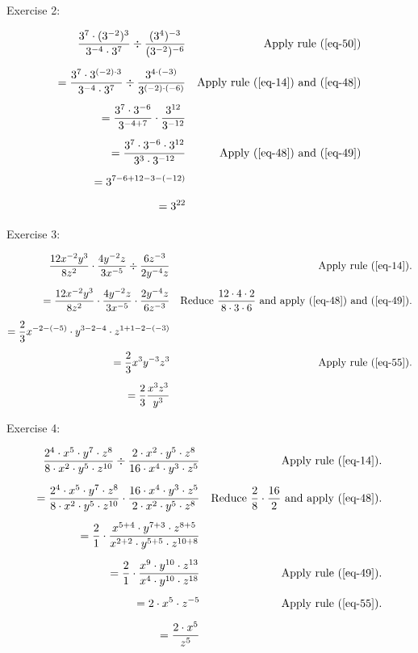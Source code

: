 Exercise 2:

\begin{align*}
    \frac{3^7 \cdot (3^{-2})^3}{3^{-4} \cdot 3^7} \div \frac{(3^4)^{-3}}{(3^{-2})^{-6}} &&\text{Apply rule \bref{eq-50}} &\\[1.25ex]
    = \frac{3^7 \cdot 3^{(-2) \cdot 3}}{3^{-4} \cdot 3^7} \div \frac{3^{4 \cdot {(-3)}}}{3^{(-2) \cdot (-6)}} &&\text{Apply rule \bref{eq-14} and \bref{eq-48}} &\\[1.25ex]
    = \frac{3^7 \cdot 3^{-6}}{3^{-4+7}} \cdot \frac{3^{12}}{3^{-12}} &\\[1.25ex]
    = \frac{3^7 \cdot 3^{-6} \cdot 3^{12}}{3^3 \cdot 3^{-12}}&&\text{Apply \bref{eq-48} and \bref{eq-49}}&\\[1.25ex]
    = 3^{7-6+12-3-(-12)}&\\[1.25ex]
    = 3^{22}&
\end{align*}

Exercise 3:

\begin{align*}
    \frac{12x^{-2} y^3}{8z^2} \cdot \frac{4y^{-2}z}{3x^{-5}} \div \frac{6z^{-3}}{2y^{-4}z} &&\text{Apply rule \bref{eq-14}.}&\\[1.25ex]
    =\frac{12x^{-2} y^3}{8z^2} \cdot \frac{4y^{-2}z}{3x^{-5}} \cdot \frac{2y^{-4}z}{6z^{-3}}&&\text{Reduce $\frac{12\cdot4\cdot2}{8\cdot3\cdot6}$ and apply \bref{eq-48} and \bref{eq-49}.}&\\[1.25ex]
    =\frac{2}{3}x^{-2-(-5)}\cdot y^{3-2-4}\cdot z^{1+1-2-(-3)}&\\[1.25ex]
    =\frac{2}{3}x^3 y^{-3} z^3 &&\text{Apply rule \bref{eq-55}.}&\\[1.25ex]
    =\frac{2}{3}\frac{x^3 z^3}{y^3}&
\end{align*}

Exercise 4:

\begin{align*}
    \frac{2^4 \cdot x^5 \cdot y^7 \cdot z^8}{8 \cdot x^2 \cdot y^5 \cdot z^{10}} \div \frac{2 \cdot x^2 \cdot y^5 \cdot z^8}{16 \cdot x^4 \cdot y^3 \cdot z^5}&&\text{Apply rule \bref{eq-14}.}&\\[1.25ex]
    = \frac{2^4 \cdot x^5 \cdot y^7 \cdot z^8}{8 \cdot x^2 \cdot y^5 \cdot z^{10}} \cdot \frac{16 \cdot x^4 \cdot y^3 \cdot z^5}{2 \cdot x^2 \cdot y^5 \cdot z^8}&&\text{Reduce $\frac{2}{8} \cdot \frac{16}{2}$ and apply \bref{eq-48}.}&\\[1.25ex]
    = \frac{2}{1}\cdot \frac{x^{5+4}\cdot y^{7+3}\cdot z^{8+5}}{x^{2+2}\cdot y^{5+5}\cdot z^{10+8}}&\\[1.25ex]
    = \frac{2}{1}\cdot \frac{x^9\cdot y^{10}\cdot z^{13}}{x^4 \cdot y^{10}\cdot z^{18}} &&\text{Apply rule \bref{eq-49}.}&\\[1.25ex]
    = 2\cdot x^5 \cdot z^{-5} &&\text{Apply rule \bref{eq-55}.}&\\[1.25ex]
    = \frac{2\cdot x^5}{z^5}&
\end{align*}

